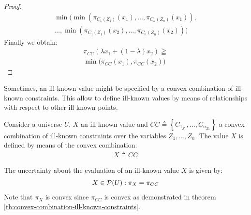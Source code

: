 \begin{proof}
\begin{align}
\nonumber
\min \big( \min \left(\pi_{C_1(Z_1)} \left( x_1 \right), \ldots, \pi_{C_n(Z_n)} \left( x_1 \right) \right),\\
\nonumber
\ldots, \min \left(\pi_{C_1(Z_1)} \left( x_2 \right), \ldots, \pi_{C_n(Z_n)} \left( x_2 \right) \right) \big)
\end{align}
Finally we obtain:
\begin{align}
\label{eq:proof-convex5}
\pi_{CC} \left( \lambda x_1 + \left( 1 - \lambda \right)x_2 \right) \geqq  \\
\nonumber
\min \big(\pi_{CC} \left( x_1 \right), \pi_{CC} \left( x_2 \right) \big)
\end{align}
\end{proof}

Sometimes, an ill-known value might be specified by a convex combination of ill-known constraints. This allow to define ill-known values by means of relationships with respect to other ill-known points.


\begin{definition}
\label{def:convex-combination-ill-known-constraints}
Consider a universe $U$, $X$ an ill-known value and $CC \triangleq \left \lbrace C_{1_{Z_1}}, \ldots, C_{n_{Z_n}}  \right \rbrace$ a convex combination of ill-known constraints over the variables $Z_1, \ldots, Z_n$. The value $X$ is defined by means of the convex combination:
\begin{align}
\label{eq:ill-known-value-by-convex-constraints}
X \triangleq CC 
\end{align}

The uncertainty about the evaluation of an ill-known value $X$ is given by:
\begin{align}
\label{eq:ill-known-value-def-by-const-unc}
X \in \mathcal{P}(U):\pi_{X}=\pi_{CC}
\end{align} 
Note that $\pi_{X}$ is convex since $\pi_{CC}$ is convex as demonstrated in theorem \ref{th:convex-combination-ill-known-constraints}.
\end{definition}


